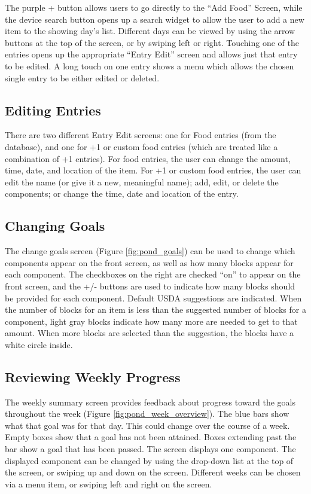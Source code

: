 The purple + button allows users to go directly to the ``Add Food'' Screen, while the device search button opens up a search widget to allow the user to add a new item to the showing day's list. Different days can be viewed by using the arrow buttons at the top of the screen, or by swiping left or right. Touching one of the entries opens up the appropriate ``Entry Edit'' screen and allows just that entry to be edited. A long touch on one entry shows a menu which allows the chosen single entry to be either edited or deleted. 

\subsection{Editing Entries}

There are two different Entry Edit screens: one for Food entries (from the database), and one for +1 or custom food entries (which are treated like a combination of +1 entries). For food entries, the user can change the amount, time, date, and location of the item. For +1 or custom food entries, the user can edit the name (or give it a new, meaningful name); add, edit, or delete the components; or change the time, date and location of the entry. 

\subsection{Changing Goals}
The change goals screen (Figure \ref{fig:pond_goals}) can be used to change which components appear on the front screen, as well as how many blocks appear for each component. The checkboxes on the right are checked ``on'' to appear on the front screen, and the +/- buttons are used to indicate how many blocks should be provided for each component. Default USDA suggestions are indicated. When the number of blocks for an item is less than the suggested number of blocks for a component, light gray blocks indicate how many more are needed to get to that amount. When more blocks are selected than the suggestion, the blocks have a white circle inside. 



 
\subsection{Reviewing Weekly Progress}

The weekly summary screen provides feedback about progress toward the goals throughout the week (Figure \ref{fig:pond_week_overview}). The blue bars show what that goal was for that day. This could change over the course of a week. Empty boxes show that a goal has not been attained. Boxes extending past the bar show a goal that has been passed. The screen displays one component. The displayed component can be changed by using the drop-down list at the top of the screen, or swiping up and down on the screen. Different weeks can be chosen via a menu item, or swiping left and right on the screen. 

